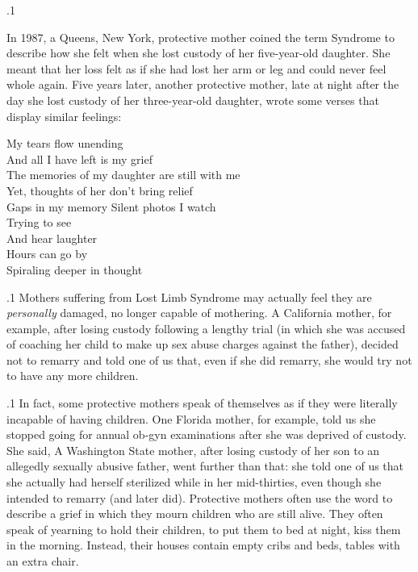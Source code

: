 \documentclass[11pt, twoside]{article}
\begin{document}
{\p.1{%
In 1987, a Queens, New York, protective mother coined the term  Syndrome to describe how she felt when she lost custody of her
five-year-old daughter. She meant that her loss felt as if she had lost her
arm or leg and could never feel whole again. Five years later, another
protective mother, late at night after the day she lost custody of her
three-year-old daughter, wrote some verses that display similar feelings:

\begin{blockQuote}
My tears flow unending\\
And all I have left is my grief\\
The memories of my daughter are still with me\\
Yet, thoughts of her don’t bring relief\\
Gaps in my memory Silent photos I watch\\
Trying to see\\
And hear laughter\\
Hours can go by\\
Spiraling deeper in thought\ellFour{2pt}{2pt}
\end{blockQuote}

}%

\p.1{%
Mothers suffering from Lost Limb Syndrome may actually feel they
are \textit{personally} damaged, no longer capable of mothering. A California
mother, for example, after losing custody following a lengthy trial (in
which she was accused of coaching her child to make up sex abuse
charges against the father), decided not to remarry and told one of
us that, even if she did remarry, she would try not to have any more
children.
}%

\p.1{%
In fact, some protective mothers speak of themselves as if they were
literally incapable of having children. One Florida mother, for example,
told us she stopped going for annual ob-gyn examinations after she was
deprived of custody. She said,  A Washington State
mother, after losing custody of her son to an allegedly sexually abusive
father, went further than that: she told one of us that she actually had
herself sterilized while in her mid-thirties, even though she intended to
remarry (and later did).
Protective mothers often use the word  to describe a grief
in which they mourn children who are still alive. They often speak of
yearning to hold their children, to put them to bed at night, kiss them in
the morning. Instead, their houses contain empty cribs and beds, tables
with an extra chair.
}%

}
\end{document}
